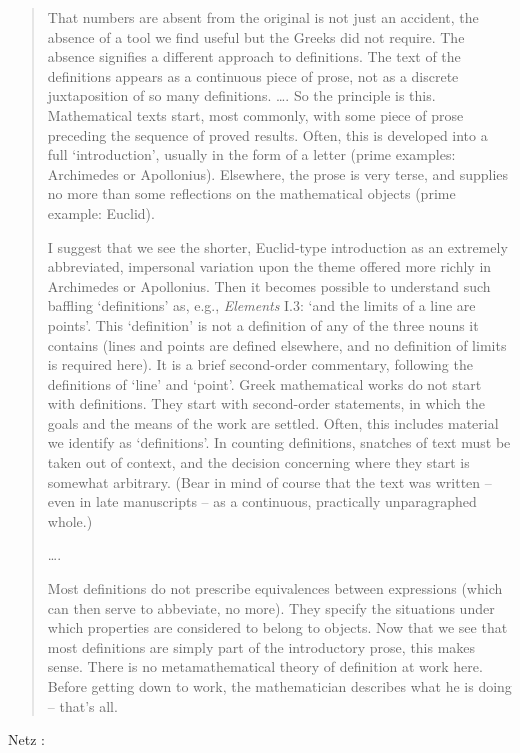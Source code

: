 \documentclass{article}
\begin{document}
\begin{quote}
That numbers are absent from the original is not just an accident,
the absence of a tool we find useful but the Greeks did not require.
The absence signifies a different approach to definitions. The text of
the definitions appears as a continuous piece of prose, not as a discrete
juxtaposition of so many definitions. \dots. So the principle
is this. Mathematical texts start, most commonly, with some piece of
prose preceding the sequence of proved results. Often, this is developed
into a full `introduction', usually in the form of a letter (prime
examples: Archimedes or Apollonius). Elsewhere, the prose is very
terse, and supplies no more than some reflections on the mathematical
objects (prime example: Euclid).

I suggest that we see the shorter, Euclid-type introduction as an
extremely abbreviated, impersonal variation upon the theme offered
more richly in Archimedes or Apollonius. Then it becomes possible to 
understand such baffling `definitions' as, e.g., {\em Elements} I.3: `and the
limits of a line are points'. This `definition' is not a definition of any
of the three nouns it contains (lines and points are defined elsewhere,
and no definition of limits is required here). It is a brief second-order
commentary, following the definitions of `line' and `point'. Greek 
mathematical works do not start with definitions. They start with
second-order statements, in which the goals and the means of the work are
settled. Often, this includes material we identify as `definitions'. In
counting definitions, snatches of text must be taken out of context, and
the decision concerning where they start is somewhat arbitrary. (Bear 
in mind of course that the text was written -- even in late manuscripts -- 
as a continuous, practically unparagraphed whole.)

\dots.

Most definitions do not prescribe equivalences
between expressions (which can then serve to abbeviate, no more).
They specify the situations under which properties are considered to
belong to objects. Now that we see that most definitions are simply
part of the introductory prose, this makes sense. There is no metamathematical
theory of definition at work here. Before getting down to
work, the mathematician describes what he is doing -- that's all.
\end{quote}

Netz \cite[p.~238]{netz}:
\end{document}
